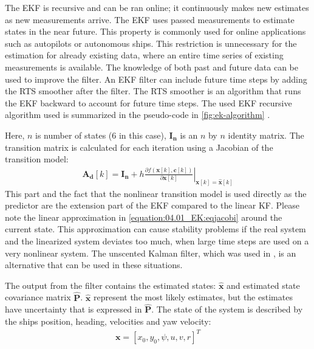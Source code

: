 The EKF is recursive and can be ran online; it continuously makes new estimates as new measurements arrive. The EKF uses passed measurements to estimate states in the near future. This property is commonly used for online applications such as autopilots or autonomous ships. This restriction is unnecessary for the estimation for already existing data, where an entire time series of existing measurements is available. The knowledge of both past and future data can be used to improve the filter. An EKF filter can include future time steps by adding the RTS smoother after the filter. The RTS smoother is an algorithm that runs the EKF backward to account for future time steps. The used EKF recursive algorithm used is summarized in the pseudo-code in \autoref{fig:ek-algorithm} \cite{brownIntroductionRandomSignals1997}.
\clearpage

Here, \(n\) is number of states (6 in this case), \(\mathbf{I_n}\) is an $n$ by $n$ identity matrix.
The transition matrix is calculated for each iteration using a Jacobian of the transition model:
\begin{equation}\label{equation:04.01_EK:eqjacobi}
\begin{split}\mathbf{A_d}[k] = \mathbf{I_n} + h \left. \frac{\partial f \left(\mathbf{x}[k],\mathbf{c}[k] \right)}{\partial \mathbf{x}[k]} \right|_{\mathbf{x}[k]=\mathbf{\hat{x}}[k]}\end{split}
\end{equation}
This part and the fact that the nonlinear transition model is used directly as the predictor are the extension part of the EKF compared to the linear KF. Please note the linear approximation in \autoref{equation:04.01_EK:eqjacobi} around the current state. This approximation can cause stability problems if the real system and the linearized system deviates too much, when large time steps are used on a very nonlinear system. The unscented Kalman filter, which was used in \textcite{revestidoherreroTwostepIdentificationNonlinear2012}, is an alternative that can be used in these situations.

The output from the filter contains the estimated states: \(\mathbf{\hat{x}}\) and estimated state covariance matrix \(\mathbf{\hat{P}}\). \(\mathbf{\hat{x}}\) represent the most likely estimates, but the estimates have uncertainty that is expressed in \(\mathbf{\hat{P}}\).
The state of the system is described by the ships position, heading, velocities and yaw velocity:
\begin{equation}\label{equation:04.01_EK:eqstates}
\begin{split}\mathbf{x} = [x_0,y_0,\psi,u,v,r]^T\end{split}
\end{equation}

